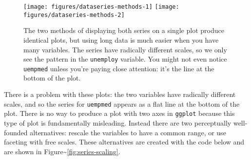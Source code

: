 \begin{Shaded}
\begin{Highlighting}[]
\StringTok{ }
\StringTok{  }\NormalTok{(}\NormalTok{(}  \NormalTok{)) +}\StringTok{ }
\StringTok{  }\NormalTok{(}\NormalTok{(}  \NormalTok{)) +}\StringTok{ }
\StringTok{  }\NormalTok{(}\NormalTok{)}

\StringTok{ }
  \NormalTok{, } 
\end{Highlighting}
\end{Shaded}

\begin{figure}
\texttt{[image: figures/dataseries-methods-1]} \texttt{[image: figures/dataseries-methods-2]} \caption{The two methods of displaying both series on a single plot produce identical plots, but using long data is much easier when you have many variables.  The series have radically different scales, so we only see the pattern in the \texttt{unemploy} variable. You might not even notice \texttt{uempmed} unless you're paying close attention: it's the line at the bottom of the plot.\label{fig:series-methods}}
\end{figure}

There is a problem with these plots: the two variables have radically
different scales, and so the series for \texttt{uempmed} appears as a
flat line at the bottom of the plot. There is no way to produce a plot
with two axes in \texttt{ggplot} because this type of plot is
fundamentally misleading. Instead there are two perceptually
well-founded alternatives: rescale the variables to have a common range,
or use faceting with free scales. These alternatives are created with
the code below and are shown in
Figure\textasciitilde{}\ref{fig:series-scaling}. 

